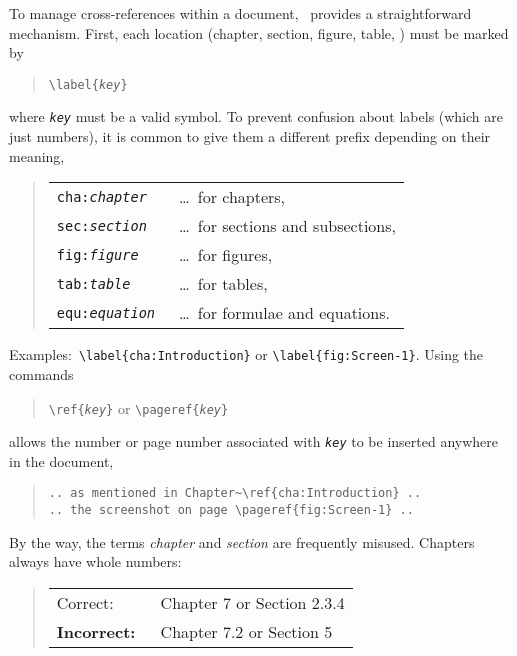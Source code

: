 To manage cross-references within a document, \latex\ provides a straightforward
mechanism. First, each location (chapter, section, figure, table, \etc) must be
marked by
%
\begin{quote}
    \verb!\label{!\texttt{\em key}\verb!}!
\end{quote}
%
where \texttt{\em key} must be a valid \latex symbol.
To prevent confusion about labels (which are just numbers), it is common to give
them a different prefix depending on their meaning, \eg
%
\begin{quote}
    \begin{tabular}{ll}
        \verb!cha:!\texttt{\em chapter} & \ \ldots\ for chapters, \\
        \verb!sec:!\texttt{\em section} & \ \ldots\ for sections and
        subsections, \\
        \verb!fig:!\texttt{\em figure} & \ \ldots\ for figures, \\
        \verb!tab:!\texttt{\em table} & \ \ldots\ for tables, \\
        \verb!equ:!\texttt{\em equation} & \ \ldots\ for formulae and equations.
    \end{tabular}
\end{quote}
%
\noindent
Examples:\ \verb!\label{cha:Introduction}! or \verb!\label{fig:Screen-1}!.
Using the commands
%
\begin{quote}
    \verb!\ref{!\texttt{\emph{key}}\verb!}!
    \hspace{1em} or \hspace{1em}
    \verb!\pageref{!\texttt{\emph{key}}\verb!}!
\end{quote}
%
allows the number or page number associated with \texttt{\emph{key}} to be
inserted anywhere in the document, \eg
%
\begin{quote}
    \verb!.. as mentioned in Chapter~\ref{cha:Introduction} ..!\\
    \verb!.. the screenshot on page \pageref{fig:Screen-1} ..!
\end{quote}
%
By the way, the terms \emph{chapter} and \emph{section} are frequently misused.
Chapters always have whole numbers:
%
\begin{quote}
    \begin{tabular}{ll}
        \textrm{Correct:\ } & Chapter 7 or Section 2.3.4 \\
        \textbf{Incorrect:\ }  & Chapter 7.2 or Section 5
    \end{tabular}
\end{quote}

